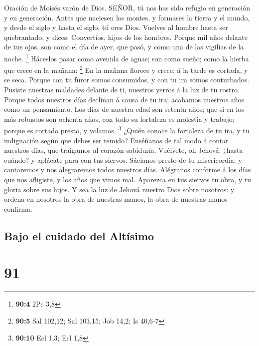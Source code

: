  Oración de Moisés varón de Dios. SEÑOR, tú nos has sido
refugio en generación y en generación.  Antes que naciesen
los montes, y formases la tierra y el mundo, y desde el siglo y hasta el
siglo, tú eres Dios.  Vuelves al hombre hasta ser
quebrantado, y dices: Convertíos, hijos de los hombres. 
Porque mil años delante de tus ojos, son como el día de ayer, que pasó,
y como una de las vigilias de la noche. \footnote{\textbf{90:4} 2Pe 3,8}
 Háceslos pasar como avenida de aguas; son como sueño; como
la hierba que crece en la mañana: \footnote{\textbf{90:5} Sal 102,12;
  Sal 103,15; Job 14,2; Is 40,6-7}  En la mañana florece y
crece; á la tarde es cortada, y se seca.  Porque con tu
furor somos consumidos, y con tu ira somos conturbados. 
Pusiste nuestras maldades delante de ti, nuestros yerros á la luz de tu
rostro.  Porque todos nuestros días declinan á causa de tu
ira; acabamos nuestros años como un pensamiento.  Los días
de nuestra edad son setenta años; que si en los más robustos son ochenta
años, con todo su fortaleza es molestia y trabajo; porque es cortado
presto, y volamos. \footnote{\textbf{90:10} Ecl 1,3; Ecl 1,8}
 ¿Quién conoce la fortaleza de tu ira, y tu indignación
según que debes ser temido?  Enséñanos de tal modo á contar
nuestros días, que traigamos al corazón sabiduría. 
Vuélvete, oh Jehová: ¿hasta cuándo? y aplácate para con tus siervos.
 Sácianos presto de tu misericordia: y cantaremos y nos
alegraremos todos nuestros días.  Alégranos conforme á los
días que nos afligiste, y los años que vimos mal.  Aparezca
en tus siervos tu obra, y tu gloria sobre sus hijos.  Y sea
la luz de Jehová nuestro Dios sobre nosotros: y ordena en nosotros la
obra de nuestras manos, la obra de nuestras manos confirma.

\hypertarget{bajo-el-cuidado-del-altuxedsimo}{%
\subsection{Bajo el cuidado del
Altísimo}\label{bajo-el-cuidado-del-altuxedsimo}}

\hypertarget{section-90}{%
\section{91}\label{section-90}}

